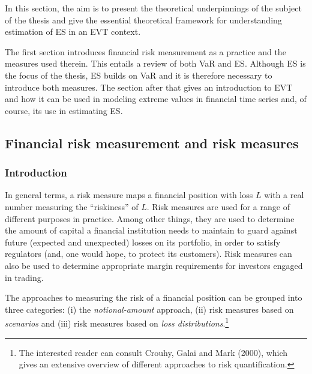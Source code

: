 \documentclass[a4paper,11pt]{article}
\theoremstyle{definition}
\theoremstyle{definition}
\theoremstyle{definition}
\theoremstyle{definition}
\theoremstyle{remark}
\begin{document}
In this section, the aim is to present the theoretical underpinnings of the subject of the thesis and give the essential theoretical framework for understanding estimation of ES in an EVT context.

The first section introduces financial risk measurement as a practice and the measures used therein. This entails a review of both VaR and ES. Although ES is the focus of the thesis, ES builds on VaR and it is therefore necessary to introduce both measures. The section after that gives an introduction to EVT and how it can be used in modeling extreme values in financial time series and, of course, its use in estimating ES.

\hypertarget{financial-risk-measurement-and-risk-measures}{%
\subsection{Financial risk measurement and risk measures}\label{financial-risk-measurement-and-risk-measures}}

\hypertarget{introduction-1}{%
\subsubsection{Introduction}\label{introduction-1}}

In general terms, a risk measure maps a financial position with loss \(L\) with a real number measuring the ``riskiness'' of \(L\). Risk measures are used for a range of different purposes in practice. Among other things, they are used to determine the amount of capital a financial institution needs to maintain to guard against future (expected and unexpected) losses on its portfolio, in order to satisfy regulators (and, one would hope, to protect its customers). Risk measures can also be used to determine appropriate margin requirements for investors engaged in trading.

The approaches to measuring the risk of a financial position can be grouped into three categories: (i) the \emph{notional-amount} approach, (ii) risk measures based on \emph{scenarios} and (iii) risk measures based on \emph{loss distributions}.\footnote{The interested reader can consult Crouhy, Galai and Mark (2000), which gives an extensive overview of different approaches to risk quantification.}
\end{document}
